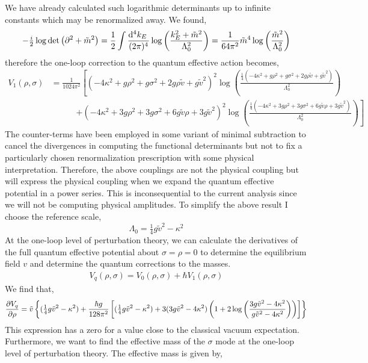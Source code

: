 \documentclass[12pt]{article}
\begin{document}
We have already calculated such logarithmic determinants up to infinite constants which may be renormalized away. We found,
\[ -\tfrac{i}{2} \log{\det{\left(\partial^2 + \tilde{m}^2 \right)}} = \frac{1}{2} \int \frac{\mathrm{d}^{4} k_E \:}{(2\pi)^4} \log{\left( \frac{k_E^2 + \tilde{m}^2}{\Lambda_0^2} \right)}  = \frac{1}{64 \pi^2} \tilde{m}^4 \log{\left( \frac{\tilde{m}^2}{\Lambda_0^2}  \right)}  \]
therefore the one-loop correction to the quantum effective action becomes,
\begin{align*}
V_1(\rho, \sigma) & = \frac{1}{1024 \pi^2} \left[ \left( - 4 \kappa^2 + g \rho^2 + g \sigma^2 + 2 g \rho \tilde{v} + g \tilde{v}^2 \right)^2 \log{\left( \frac{\tfrac{1}{4} \left( - 4 \kappa^2 + g \rho^2 + g \sigma^2 + 2 g \rho \tilde{v} + g \tilde{v}^2 \right)}{\Lambda_0^2} \right)} 
\right. 
\\
& \quad \quad \quad  \left. + \left( - 4 \kappa^2 + 3 g \rho^2 + 3 g \sigma^2 + 6 g \tilde{v} \rho + 3 g \tilde{v}^2  \right)^2 \log{\left( \frac{\tfrac{1}{4} \left( - 4 \kappa^2 + 3 g \rho^2 + 3 g \sigma^2 + 6 g \tilde{v} \rho + 3 g \tilde{v}^2  \right)}{\Lambda_0^2} \right)} \right]
\end{align*}
The counter-terms have been employed in some variant of minimal subtraction to cancel the divergences in computing the functional determinants but not to fix a particularly chosen renormalization prescription with some physical interpretation. Therefore, the above couplings are not the physical coupling but will express the physical coupling when we expand the quantum effective potential in a power series. This is inconsequential to the current analysis since we will not be computing physical amplitudes. To simplify the above result I choose the reference scale,
\[ \Lambda_0 = \tfrac{1}{4} g \tilde{v}^2 - \kappa^2 \]
At the one-loop level of perturbation theory, we can calculate the derivatives of the full quantum effective potential about $\sigma = \rho = 0$ to determine the equilibrium field $v$ and determine the quantum corrections to the masses. 
\begin{align*}
V_q(\rho, \sigma) = V_0(\rho, \sigma) + \hbar V_1(\rho, \sigma) 
\end{align*}
We find that,
\[ \frac{\partial{V_q}}{\partial{\rho}} = \tilde{v}  \left\{ (\tfrac{1}{4} g \tilde{v}^2 - \kappa^2) + \frac{\hbar g}{128 \pi^2}  \left[ (\tfrac{1}{4} g \tilde{v}^2 - \kappa^2) + 3 (3 g \tilde{v}^2 - 4 \kappa^2) \left( 1 + 2 \log{\left( \frac{3 g \tilde{v}^2 - 4 \kappa^2}{g \tilde{v}^2 - 4 \kappa^2} \right)} \right) \right] \right\} \]
This expression has a zero for a value close to the classical vacuum expectation. Furthermore, we want to find the effective mass of the $\sigma$ mode at the one-loop level of perturbation theory. The effective mass is given by,
\end{document}
